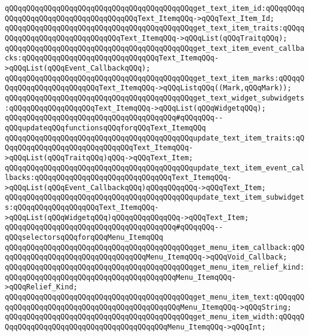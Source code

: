 \verb|qQQqqQQqqQQqqQQqqQQqqQQqqQQqqQQqqQQqqQQqqQQqget_text_item_id:qQQqqQQqqQQqqQQqqQQqqQQqqQQqqQQqqQQqqQQqText_ItemqQQq->qQQqText_Item_Id;|\newline
\verb|qQQqqQQqqQQqqQQqqQQqqQQqqQQqqQQqqQQqqQQqqQQqget_text_item_traits:qQQqqQQqqQQqqQQqqQQqqQQqqQQqqQQqText_ItemqQQq->qQQqList(qQQqTraitqQQq);|\newline
\verb|qQQqqQQqqQQqqQQqqQQqqQQqqQQqqQQqqQQqqQQqqQQqget_text_item_event_callbacks:qQQqqQQqqQQqqQQqqQQqqQQqqQQqqQQqText_ItemqQQq->qQQqList(qQQqEvent_CallbackqQQq);|\newline
\verb|qQQqqQQqqQQqqQQqqQQqqQQqqQQqqQQqqQQqqQQqqQQqget_text_item_marks:qQQqqQQqqQQqqQQqqQQqqQQqqQQqText_ItemqQQq->qQQqListqQQq((Mark,qQQqMark));|\newline
\verb|qQQqqQQqqQQqqQQqqQQqqQQqqQQqqQQqqQQqqQQqqQQqget_text_widget_subwidgets:qQQqqQQqqQQqqQQqqQQqText_ItemqQQq->qQQqList(qQQqWidgetqQQq);|\newline
\verb|qQQqqQQqqQQqqQQqqQQqqQQqqQQqqQQqqQQqqQQq#qQQqqQQq--qQQqupdateqQQqfunctionsqQQqforqQQqText_ItemqQQq|\newline
\verb|qQQqqQQqqQQqqQQqqQQqqQQqqQQqqQQqqQQqqQQqqQQqupdate_text_item_traits:qQQqqQQqqQQqqQQqqQQqqQQqqQQqqQQqText_ItemqQQq->qQQqList(qQQqTraitqQQq)qQQq->qQQqText_Item;|\newline
\verb|qQQqqQQqqQQqqQQqqQQqqQQqqQQqqQQqqQQqqQQqqQQqupdate_text_item_event_callbacks:qQQqqQQqqQQqqQQqqQQqqQQqqQQqqQQqText_ItemqQQq->qQQqList(qQQqEvent_CallbackqQQq)qQQqqQQqqQQq->qQQqText_Item;|\newline
\verb|qQQqqQQqqQQqqQQqqQQqqQQqqQQqqQQqqQQqqQQqqQQqupdate_text_item_subwidgets:qQQqqQQqqQQqqQQqqQQqText_ItemqQQq->qQQqList(qQQqWidgetqQQq)qQQqqQQqqQQqqQQq->qQQqText_Item;|\newline
\newline
\verb|qQQqqQQqqQQqqQQqqQQqqQQqqQQqqQQqqQQqqQQq#qQQqqQQq--qQQqselectorsqQQqforqQQqMenu_ItemqQQq|\newline
\verb|qQQqqQQqqQQqqQQqqQQqqQQqqQQqqQQqqQQqqQQqqQQqget_menu_item_callback:qQQqqQQqqQQqqQQqqQQqqQQqqQQqqQQqqQQqMenu_ItemqQQq->qQQqVoid_Callback;|\newline
\verb|qQQqqQQqqQQqqQQqqQQqqQQqqQQqqQQqqQQqqQQqqQQqget_menu_item_relief_kind:qQQqqQQqqQQqqQQqqQQqqQQqqQQqqQQqqQQqqQQqMenu_ItemqQQq->qQQqRelief_Kind;|\newline
\verb|qQQqqQQqqQQqqQQqqQQqqQQqqQQqqQQqqQQqqQQqqQQqget_menu_item_text:qQQqqQQqqQQqqQQqqQQqqQQqqQQqqQQqqQQqqQQqqQQqqQQqMenu_ItemqQQq->qQQqString;|\newline
\verb|qQQqqQQqqQQqqQQqqQQqqQQqqQQqqQQqqQQqqQQqqQQqget_menu_item_width:qQQqqQQqqQQqqQQqqQQqqQQqqQQqqQQqqQQqqQQqqQQqMenu_ItemqQQq->qQQqInt;|\newline
